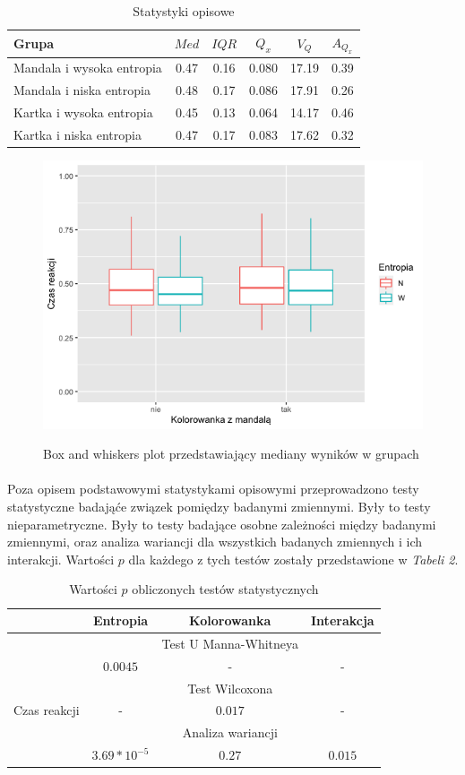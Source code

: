 \documentclass[12pt,a4paper,final,oneside,onecolumn,titlepage]{article}
\begin{document}
\begin{table}[h]
\caption{Statystyki opisowe}
\centering
\begin{tabular}{l c c c c c}
\hline\hline
Grupa & $Med$ & $IQR$ & $Q_x$ & $V_Q$ & $A_{Q_{x}}$ \\ [0.5ex]
\hline
Mandala i wysoka entropia&0.47&0.16&0.080&17.19&0.39 \\
Mandala i niska entropia&0.48&0.17&0.086&17.91&0.26 \\
Kartka i wysoka entropia&0.45&0.13&0.064&14.17&0.46 \\
Kartka i niska entropia&0.47&0.17&0.083&17.62&0.32 \\ [1ex]
\hline
\end{tabular}
\label{Tabela}
\end{table}
\begin{figure}[h]
\centering
\caption{Box and whiskers plot przedstawiający mediany wyników w grupach}
\includegraphics[scale=0.5]{box1}
\label{Rysunek}
\end{figure}
\paragraph{}
Poza opisem podstawowymi statystykami opisowymi przeprowadzono testy statystyczne badająće związek pomiędzy badanymi zmiennymi. Były to testy nieparametryczne. Były to testy badające osobne zależności między badanymi zmiennymi, oraz analiza wariancji dla wszystkich badanych zmiennych i ich interakcji. Wartości $p$ dla każdego z tych testów zostały przedstawione w \textit{Tabeli 2}.
\begin{table}[h]
\caption{Wartości $p$ obliczonych testów statystycznych}
\centering
\begin{tabular}{l c c c}
\hline\hline
 & Entropia & Kolorowanka & Interakcja \\ [0.5ex]
\hline
 & & Test U Manna-Whitneya& \\
 &$0.0045$&-&- \\
\hline
 & & Test Wilcoxona & \\
Czas reakcji&-&$0.017$&- \\ 
\hline
 & & Analiza wariancji & \\
 &$3.69*10^{-5}$&$0.27$&$0.015$ \\
\hline
\end{tabular}
\label{Tabela}
\end{table}
\end{document}
